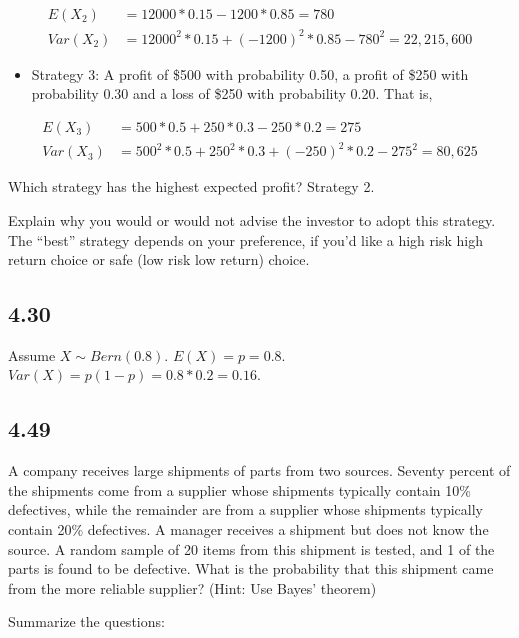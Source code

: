 \documentclass[
]{article}
\providecommand{\tightlist}{%
  \setlength{\itemsep}{0pt}\setlength{\parskip}{0pt}}
\begin{document}
\[
    \begin{align*}
    E(X_2) &= 12000*0.15 - 1200 * 0.85 = 780 \\
    Var(X_2) &= 12000^2*0.15 + (-1200)^2*0.85 - 780^2 = 22,215,600
    \end{align*}
\]

\begin{itemize}
\tightlist
\item
  Strategy 3: A profit of \$500 with probability 0.50, a profit of \$250
  with probability 0.30 and a loss of \$250 with probability 0.20. That
  is,
\end{itemize}

\[
\begin{align*}
    E(X_3) &= 500*0.5 + 250*0.3 - 250 * 0.2 = 275 \\
    Var(X_3) &= 500^2*0.5 + 250^2*0.3 + (-250)^2*0.2 - 275^2 = 80,625
    \end{align*}
\]

Which strategy has the highest expected profit? Strategy 2.

Explain why you would or would not advise the investor to adopt this
strategy. The ``best'' strategy depends on your preference, if you'd
like a high risk high return choice or safe (low risk low return)
choice.

\hypertarget{section-2}{%
\subsection{4.30}\label{section-2}}

Assume \(X \sim Bern(0.8)\). \(E(X) = p = 0.8\).
\(Var(X) = p(1-p) = 0.8*0.2 = 0.16\).

\hypertarget{section-3}{%
\subsection{4.49}\label{section-3}}

A company receives large shipments of parts from two sources. Seventy
percent of the shipments come from a supplier whose shipments typically
contain 10\% defectives, while the remainder are from a supplier whose
shipments typically contain 20\% defectives. A manager receives a
shipment but does not know the source. A random sample of 20 items from
this shipment is tested, and 1 of the parts is found to be defective.
What is the probability that this shipment came from the more reliable
supplier? (Hint: Use Bayes' theorem)

Summarize the questions:
\end{document}
